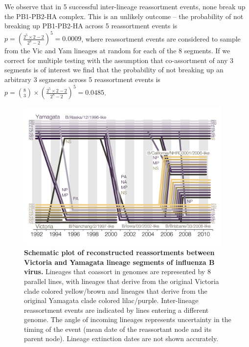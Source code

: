 \documentclass[11pt,oneside,letterpaper]{article}
\begin{document}
We observe that in 5 successful inter-lineage reassortment events, none break up the PB1-PB2-HA complex.
This is an unlikely outcome -- the probability of not breaking up PB1-PB2-HA across 5 reassortment events is $p = (\frac{2^{5} \times 2 - 2}{2^{8} - 2})^{5} = 0.0009$, where reassortment events are considered to sample from the Vic and Yam lineages at random for each of the 8 segments.
If we correct for multiple testing with the assumption that co-assortment of any 3 segments is of interest we find that the probability of not breaking up an arbitrary 3 segments across 5 reassortment events is $p = \binom{8}{3} \times (\frac{2^{5} \times 2 - 2}{2^{8} - 2})^{5} = 0.0485$.

\begin{figure}[h]
	\centering		
	\includegraphics[width=0.95\textwidth]{figures/RailroadPlotDated.pdf}
	\caption{\textbf{Schematic plot of reconstructed reassortments between Victoria and Yamagata lineage segments of influenza B virus.}
Lineages that coassort in genomes are represented by 8 parallel lines, with lineages that derive from the original Victoria clade colored yellow/brown and lineages that derive from the original Yamagata clade colored lilac/purple.
Inter-lineage reassortment events are indicated by lines entering a different genome.
The angle of incoming lineages represents uncertainty in the timing of the event (mean date of the reassortant node and its parent node).
Lineage extinction dates are not shown accurately.}
	\label{railroadPlot}
\end{figure}
\end{document}
